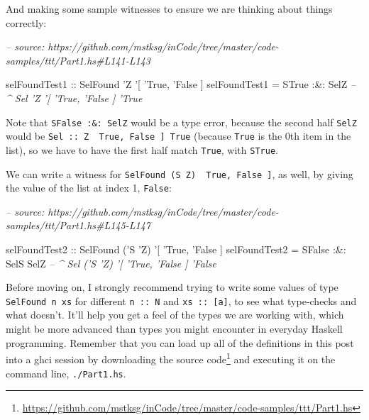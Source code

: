 \documentclass[]{article}
\newenvironment{Shaded}{}{}
\newcommand{\CommentTok}[1]{\textcolor[rgb]{0.38,0.63,0.69}{\textit{#1}}}
\newcommand{\DataTypeTok}[1]{\textcolor[rgb]{0.56,0.13,0.00}{#1}}
\newcommand{\FunctionTok}[1]{\textcolor[rgb]{0.02,0.16,0.49}{#1}}
\newcommand{\NormalTok}[1]{#1}
\newcommand{\OtherTok}[1]{\textcolor[rgb]{0.00,0.44,0.13}{#1}}
\renewcommand{\href}[2]{#2\footnote{\url{#1}}}
\begin{document}
And making some sample witnesses to ensure we are thinking about things
correctly:

\begin{Shaded}
\begin{Highlighting}[]
\CommentTok{-- source: https://github.com/mstksg/inCode/tree/master/code-samples/ttt/Part1.hs#L141-L143}

\OtherTok{selFoundTest1 ::} \DataTypeTok{SelFound}\NormalTok{ '}\DataTypeTok{Z}\NormalTok{ '[ '}\DataTypeTok{True}\NormalTok{, '}\DataTypeTok{False}\NormalTok{ ]}
\NormalTok{selFoundTest1 }\FunctionTok{=} \DataTypeTok{STrue} \FunctionTok{:&:} \DataTypeTok{SelZ}
                       \CommentTok{-- ^ Sel 'Z '[ 'True, 'False ] 'True}
\end{Highlighting}
\end{Shaded}

Note that \texttt{SFalse\ :\&:\ SelZ} would be a type error, because the second
half \texttt{SelZ} would be
\texttt{Sel\ ::\ \textquotesingle{}Z\ \textquotesingle{}{[}\ \textquotesingle{}True,\ \textquotesingle{}False\ {]}\ \textquotesingle{}True}
(because \texttt{\textquotesingle{}True} is the 0th item in the list), so we
have to have the first half match \texttt{\textquotesingle{}True}, with
\texttt{STrue}.

We can write a witness for
\texttt{SelFound\ (\textquotesingle{}S\ \textquotesingle{}Z)\ \textquotesingle{}{[}\ \textquotesingle{}True,\ \textquotesingle{}False\ {]}},
as well, by giving the value of the list at index 1,
\texttt{\textquotesingle{}False}:

\begin{Shaded}
\begin{Highlighting}[]
\CommentTok{-- source: https://github.com/mstksg/inCode/tree/master/code-samples/ttt/Part1.hs#L145-L147}

\OtherTok{selFoundTest2 ::} \DataTypeTok{SelFound}\NormalTok{ ('}\DataTypeTok{S}\NormalTok{ '}\DataTypeTok{Z}\NormalTok{) '[ '}\DataTypeTok{True}\NormalTok{, '}\DataTypeTok{False}\NormalTok{ ]}
\NormalTok{selFoundTest2 }\FunctionTok{=} \DataTypeTok{SFalse} \FunctionTok{:&:} \DataTypeTok{SelS} \DataTypeTok{SelZ}
                        \CommentTok{-- ^ Sel ('S 'Z) '[ 'True, 'False ] 'False}
\end{Highlighting}
\end{Shaded}

Before moving on, I strongly recommend trying to write some values of type
\texttt{SelFound\ n\ xs} for different \texttt{n\ ::\ N} and
\texttt{xs\ ::\ {[}a{]}}, to see what type-checks and what doesn't. It'll help
you get a feel of the types we are working with, which might be more advanced
than types you might encounter in everyday Haskell programming. Remember that
you can load up all of the definitions in this post into a ghci session by
downloading
\href{https://github.com/mstksg/inCode/tree/master/code-samples/ttt/Part1.hs}{the
source code} and executing it on the command line, \texttt{./Part1.hs}.
\end{document}
